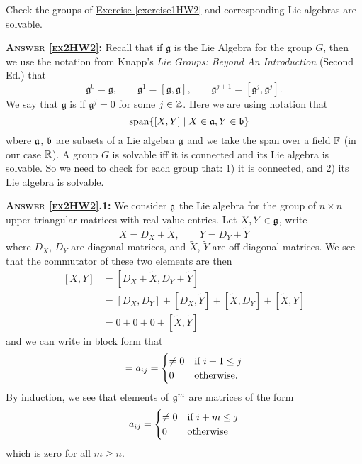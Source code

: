 \begin{exercise}\label{ex2HW2}
Check the groups of \hyperref[exercise1HW2]{Exercise \ref{exercise1HW2}}
 and corresponding Lie algebras are solvable.
\end{exercise}
\medbreak
\noindent\textsc{\textbf{Answer \ref{ex2HW2}:\enspace}}
Recall that if $\mathfrak{g}$ is the Lie Algebra for the group
$G$, then we use the notation from Knapp's \emph{Lie Groups: Beyond An Introduction}
 (Second Ed.) that
\begin{equation}
\mathfrak{g}^{0}=
\mathfrak{g},\qquad
\mathfrak{g}^{1}=[
\mathfrak{g},
\mathfrak{g}],\qquad
\mathfrak{g}^{j+1}=[
\mathfrak{g}^{j},
\mathfrak{g}^{j}].
\end{equation}
We say that $\mathfrak{g}$ is  if
$\mathfrak{g}^{j}=0$ for some $j\in\Bbb{Z}$. Here we are using
notation that
\begin{equation}
[\mathfrak{a},\frak{b}]=\mathop{\rm span}\nolimits\{[X,Y]\mid X\in\frak{a},Y\in\frak{b}\}
\end{equation}
wbere $\frak{a}$, $\frak{b}$ are subsets of a Lie algebra
$\frak{g}$ and we take the span over a field $\Bbb{F}$ (in our
case $\Bbb{R}$). A group $G$ is solvable iff it is connected and
its Lie algebra is solvable. So we need to check for each group
that: 1) it is connected, and 2) its Lie algebra is solvable.

\medbreak
\noindent\textsc{\textbf{Answer \ref{ex2HW2}.1:\enspace}}
We consider $\frak{g}$ the Lie algebra for the group of $n\times
n$ upper triangular matrices with real value entries. Let
$X,Y\in\frak{g}$, write
\begin{equation}
X=D_{X}+\widetilde{X},\qquad Y=D_{Y}+\widetilde{Y}
\end{equation}
where $D_{X}$, $D_{Y}$ are diagonal matrices, and
$\widetilde{X}$, $\widetilde{Y}$ are off-diagonal matrices. We
see that the commutator of these two elements are then
\begin{subequations}
\begin{align}
[X,Y]&=[D_{X}+\widetilde{X},D_{Y}+\widetilde{Y}]\\
&=[D_{X},D_{Y}]+[D_{X},\widetilde{Y}]+[\widetilde{X},D_{Y}]+[\widetilde{X},\widetilde{Y}]\\
&=0+0+0+[\widetilde{X},\widetilde{Y}]
\end{align}
\end{subequations}
and we can write in block form that
\begin{equation}
[\widetilde{X},\widetilde{Y}] = a_{ij} = \begin{cases}\not=0&\hbox{if
  }i+1\leq j\\
0 & \hbox{otherwise}.
\end{cases}
\end{equation}
By induction, we see that elements of $\frak{g}^{m}$ are matrices
of the form
\begin{equation}
a_{ij} = \begin{cases}\not=0&\hbox{if
  }i+m\leq j\\
0 & \hbox{otherwise}
\end{cases}
\end{equation}
which is zero for all $m\geq n$.

